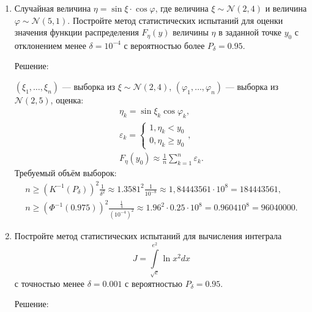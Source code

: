\documentclass[a4paper,12pt]{article}
\begin{document}
\begin{enumerate}
      \item Случайная величина $\eta = \sin \xi \cdot \cos \varphi$, где величина $\xi \sim \mathcal{N} (2, 4)$ и
            величина $\varphi \sim \mathcal{N} (5, 1)$. Постройте метод статистических испытаний для оценки значения функции распределения
            $F_\eta(y)$ величины $\eta$ в заданной точке $y_0$ с отклонением менее $\delta = 10^{-4}$ с вероятностью более $P_\delta = 0.95$.

            Решение:

            $(\xi_1, \dots, \xi_n)$ --- выборка из $\xi \sim \mathcal{N} \left( 2, 4 \right)$, $(\varphi_1, \dots, \varphi_n)$ --- выборка из $\mathcal{N} (2, 5)$,
            оценка:
            \begin{gather*}
                  \eta_k = \sin \xi_k \cos \varphi_k , \\
                  \varepsilon_k = \left \{
                  \begin{array}{ll}
                        1, \eta_k < y_0 \\
                        0, \eta_k \ge y_0
                  \end{array}
                  \right . , \\
                  F_\eta(y_0) \approx \frac{1}{n} \sum_{k=1}^n \varepsilon_k .
            \end{gather*}
            Требуемый объём выборок:
            \begin{gather*}
                  n
                  \ge \left( K^{-1} ( P_\delta ) \right)^2 \frac{1}{\delta^2}
                  \approx 1.3581^2 \frac{1}{10^{-8}}
                  \approx 1,84443561 \cdot 10^8
                  = 184 443 561 , \\
                  n \ge  \left( \Phi^{-1} \left( 0.975 \right) \right)^2 \frac{\frac{1}{4}}{\left(10^{-4}\right)^2}
                  \approx 1.96^2 \cdot 0.25 \cdot 10^8
                  = 0.9604 10^8
                  = 96 040 000.
            \end{gather*}

      \item Постройте метод статистических испытаний для вычисления интеграла
            \[
                  J = \int \limits_{\sqrt{e}}^{e^2} \ln x^2 dx
            \]
            с точностью менее $\delta = 0.001$ с вероятностью $P_\delta = 0.95$.

            Решение:


\end{enumerate}
\end{document}

